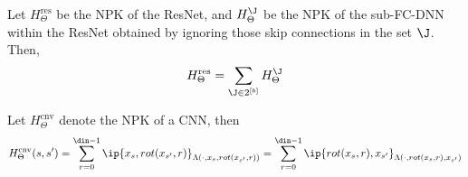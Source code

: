 \begin{lemma}\label{lm:sumofproduct}
Let $H^{\text{res}}_{\Theta}$ be the NPK of the ResNet, and $H^{\J}_{\Theta}$ be the NPK of the sub-FC-DNN within the ResNet obtained by ignoring those skip connections in the set $\J$. Then, \begin{align*}H^{\text{res}}_{\Theta}=\sum_{\J\in 2^{[b]}}H^{\J}_{\Theta}\end{align*}
\end{lemma}
\begin{comment}
\textbf{NPK of CNN:} For the sake of concreteness, we consider a $1$-dimensional CNN with circular convolutions (see \Cref{tb:cconv}), with $\dc$ convolutional layers, followed by a \emph{global-average-pooling} (GAP) layer and $\dfc$ fully connected layers. The convolutional window size is given $\wconv<\din$, the number of output filters per convolutional layer is $w$, and the width of the FC layers is also $w$. 
\end{comment}
\begin{lemma}\label{lm:cnnnpk}
Let $H^{\text{cnv}}_{\Theta}$ denote the NPK of a CNN, then 
\begin{align*}
H^{\text{cnv}}_{\Theta}(s,s')=\sum_{r=0}^{\din-1} \ip{x_s,rot(x_{s'},r)}_{\Lambda(\cdot, x_s,rot(x_{s'},r))}=\sum_{r=0}^{\din-1} \ip{rot(x_s,r),x_{s'}}_{\Lambda(\cdot, rot(x_s,r),x_{s'})}
\end{align*}
\end{lemma}
\begin{comment}
\begin{definition}
Given a vector $x\in \R^{\din}$, and $r\in[\din-1]$ define $rot(x, r)\in \R^{\din}$ to be the circularly right shifted vector by $r$ entries,  such that $rot(x,r)(i)=x(i+r), i=1,\ldots, \din-r$, and $rot(x,r)(i)=x(i+ r-\din), i= \din-r+1, \ldots, \din$.
\end{definition}
\begin{lemma}[Rotational Invariant Kernel]\label{lm:cnnnpk}
It follows that 
\begin{align*}
H^{\text{cnv}}_{\Theta}(s,s')=\sum_{r=0}^{\din-1} \ip{x_s,rot(x_{s'},r)}_{\Lambda(\cdot, x_s,rot(x_{s'},r))}=\sum_{r=0}^{\din-1} \ip{rot(x_s,r),x_{s'}}_{\Lambda(\cdot, rot(x_s,r),x_{s'})}
\end{align*}
\end{lemma}
\end{comment}


